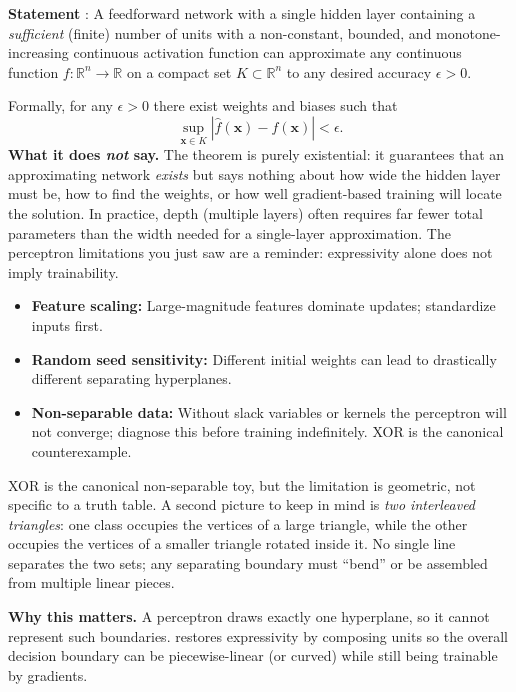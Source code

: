 \begin{tcolorbox}[summarybox, title={Universal Approximation Theorem (UAT)}]
\textbf{Statement} \citep{Cybenko1989,Hornik1991}: A feedforward network with a single hidden layer containing a \emph{sufficient} (finite) number of units with a non-constant, bounded, and monotone-increasing continuous activation function can approximate any continuous function \(f: \mathbb{R}^n \to \mathbb{R}\) on a compact set \(K \subset \mathbb{R}^n\) to any desired accuracy \(\epsilon > 0\).

Formally, for any \(\epsilon > 0\) there exist weights and biases such that
\[
  \sup_{\mathbf{x} \in K} \left| \hat{f}(\mathbf{x}) - f(\mathbf{x}) \right| < \epsilon.
\]
\textbf{What it does \emph{not} say.} The theorem is purely existential: it guarantees that an approximating network \emph{exists} but says nothing about how wide the hidden layer must be, how to find the weights, or how well gradient-based training will locate the solution. In practice, depth (multiple layers) often requires far fewer total parameters than the width needed for a single-layer approximation. The perceptron limitations you just saw are a reminder: expressivity alone does not imply trainability.
\end{tcolorbox}

\begin{tcolorbox}[summarybox, title={Common perceptron pitfalls}]
\begin{itemize}
    \item \textbf{Feature scaling:} Large-magnitude features dominate updates; standardize inputs first.
    \item \textbf{Random seed sensitivity:} Different initial weights can lead to drastically different separating hyperplanes.
    \item \textbf{Non-separable data:} Without slack variables or kernels the perceptron will not converge; diagnose this before training indefinitely. XOR is the canonical counterexample.
\end{itemize}
\end{tcolorbox}

\begin{tcolorbox}[summarybox, title={Geometry intuition: beyond XOR (two triangles)}]
XOR is the canonical non-separable toy, but the limitation is geometric, not specific to a truth table. A second picture to keep in mind is \emph{two interleaved triangles}: one class occupies the vertices of a large triangle, while the other occupies the vertices of a smaller triangle rotated inside it. No single line separates the two sets; any separating boundary must ``bend'' or be assembled from multiple linear pieces.
\medskip

\noindent\textbf{Why this matters.} A perceptron draws exactly one hyperplane, so it cannot represent such boundaries.  restores expressivity by composing units so the overall decision boundary can be piecewise-linear (or curved) while still being trainable by gradients.
\end{tcolorbox}


